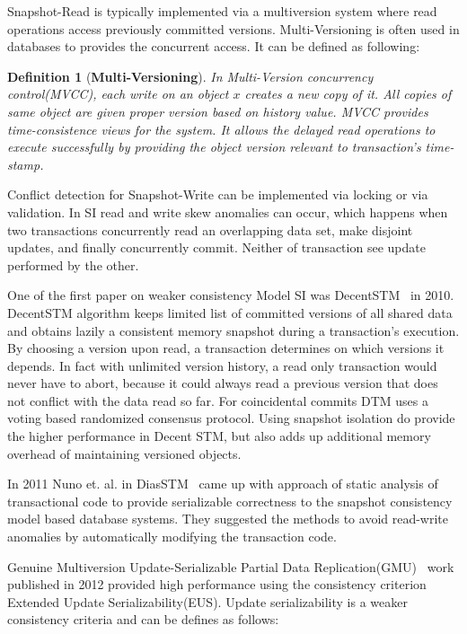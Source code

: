 \documentclass[12pt,english]{report}
\newtheorem{definition}{Definition}[section]
\begin{document}
Snapshot-Read is typically implemented via a multiversion system where read operations access previously committed versions. Multi-Versioning is often used in databases to provides the concurrent access. It can be defined as following:
\begin{definition}[\textbf{Multi-Versioning}]
In Multi-Version concurrency control(MVCC), each write on an object $x$ creates a new copy of it. All copies of same object are given proper version based on history value. MVCC provides time-consistence views for the system. It allows the delayed read operations to execute successfully by providing the object version relevant to transaction's time-stamp. 
\end{definition}

Conflict detection for Snapshot-Write can be implemented via locking or via validation. In SI read and write skew anomalies can occur, which happens when two transactions concurrently read an overlapping data set, make disjoint updates, and finally concurrently commit. Neither of transaction see update performed by the other.

One of the first paper on weaker consistency Model SI was DecentSTM~\cite{DecentSTM:5470446} in 2010.  DecentSTM algorithm keeps limited list of committed versions of all shared data and obtains lazily a consistent memory snapshot during a transaction’s execution. By choosing a version upon read, a transaction determines on which versions it depends. In fact with unlimited version history, a read only transaction would never have to abort, because it could always read a previous version that does not conflict with the data read so far. For coincidental commits DTM uses a voting based randomized consensus protocol. Using snapshot isolation do provide the higher performance in Decent STM, but also adds up additional memory overhead of maintaining versioned objects.  

In 2011 Nuno et. al. in DiasSTM~\cite{dias2011efficient} came up with approach of static analysis of transactional code to provide serializable correctness to the snapshot consistency model based database systems. They suggested the methods to avoid read-write anomalies by automatically modifying the transaction code.

Genuine Multiversion Update-Serializable Partial Data Replication(GMU)~\cite{GMU:peluso2012scalability} work published in 2012 provided high performance using the consistency criterion Extended Update Serializability(EUS). Update serializability is a weaker consistency criteria and can be defines as follows:
\end{document}
